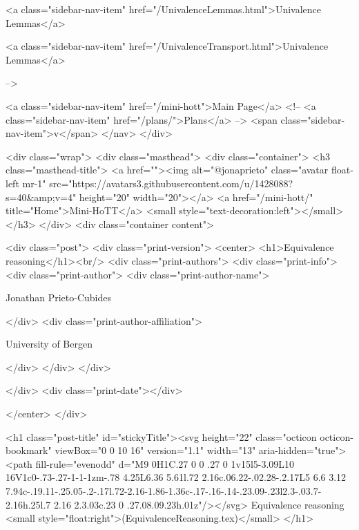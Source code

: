       
    
      
        
          <a class="sidebar-nav-item" href="/UnivalenceLemmas.html">Univalence Lemmas</a>
        
      
    
      
        
          <a class="sidebar-nav-item" href="/UnivalenceTransport.html">Univalence Lemmas</a>
        
      
     -->

    <a class="sidebar-nav-item" href="/mini-hott">Main Page</a>
    <!-- <a class="sidebar-nav-item" href="/plans/">Plans</a> -->
    <span class="sidebar-nav-item">v</span>
  </nav>
</div>

    <div class="wrap">
      <div class="masthead">
        <div class="container">
          <h3 class="masthead-title">
            <a href=""><img alt="@jonaprieto" class="avatar float-left mr-1" src="https://avatars3.githubusercontent.com/u/1428088?s=40&amp;v=4" height="20" width="20"></a>
            <a href="/mini-hott/" title="Home">Mini-HoTT</a>
            <small style="text-decoration:left"></small>
          </h3>
        </div>
      <div class="container content">
        







<div class="post">
  <div class="print-version">
    <center>
      <h1>Equivalence reasoning</h1><br/>
        <div class="print-authors">
          <div class="print-info">
            <div class="print-author">
              <div class="print-author-name">
                
                  Jonathan Prieto-Cubides
                
              </div>
              <div class="print-author-affiliation">
                
                  University of Bergen
                
                </div>
            </div>
          </div>
          
          
        </div>
        <div class="print-date"></div>
        
        
    </center>
  </div>

  

  <h1 class="post-title" id="stickyTitle"><svg height="22" class="octicon octicon-bookmark" viewBox="0 0 10 16" version="1.1" width="13" aria-hidden="true"><path fill-rule="evenodd" d="M9 0H1C.27 0 0 .27 0 1v15l5-3.09L10 16V1c0-.73-.27-1-1-1zm-.78 4.25L6.36 5.61l.72 2.16c.06.22-.02.28-.2.17L5 6.6 3.12 7.94c-.19.11-.25.05-.2-.17l.72-2.16-1.86-1.36c-.17-.16-.14-.23.09-.23l2.3-.03.7-2.16h.25l.7 2.16 2.3.03c.23 0 .27.08.09.23h.01z"/></svg> Equivalence reasoning <small style="float:right">(EquivalenceReasoning.tex)</small>
  </h1>

